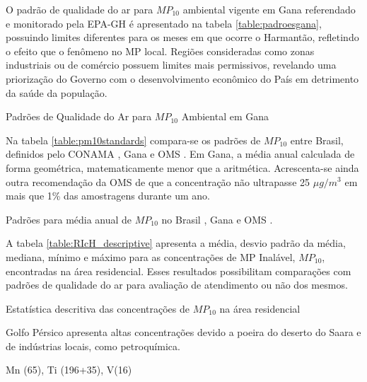 O padrão de qualidade do ar para $MP_{10}$ ambiental vigente em Gana referendado
e monitorado pela EPA-GH \citeyearpar{epa2015} é apresentado na tabela
\ref{table:padroesgana}, possuindo limites diferentes para os meses em que
ocorre o Harmantão, refletindo o efeito que o fenômeno no MP local. 
Regiões consideradas como zonas industriais ou de comércio possuem limites mais
permissivos, revelando uma priorização do Governo com o desenvolvimento 
econômico do País em detrimento da saúde da população.

\begin{table}[H]
\centering
  
\caption{Padrões de Qualidade do Ar para $MP_{10}$ Ambiental em Gana
         \cite{epa2015} \label{table:padroesgana}}
\end{table}

Na tabela \ref{table:pm10standards} compara-se os padrões de $MP_{10}$ 
entre Brasil, definidos pelo CONAMA \citeyearpar{conama1990}, Gana e OMS 
\citeyearpar{who}. Em Gana, a média anual calculada de forma geométrica, 
matematicamente menor que a aritmética. Acrescenta-se ainda outra 
recomendação da OMS de que a concentração não ultrapasse 25 $\mu g/m^3$ 
em mais que 1\% das amostragens durante um ano.

\begin{table}[H]
\centering
  
  \caption{Padrões para média anual de $MP_{10}$ no Brasil \citep{conama1990}, 
           Gana \citep{epa2015} e OMS \citep{who}. \label{table:pm10standards}}
\end{table}

A tabela \ref{table:RIcH_descriptive} apresenta a média, desvio padrão da média,
mediana, mínimo e máximo para as concentrações de MP Inalável, $MP_{10}$,  
encontradas na área residencial. Esses resultados possibilitam comparações com 
padrões de qualidade do ar para avaliação de atendimento ou não dos mesmos.    

\newpage
\begin{table}[H]
  \centering
    
  \caption{Estatística descritiva das concentrações de  $MP_{10}$ na área 
           residencial \label{table:RIcH_descriptive}}
\end{table}

\citep{kaku2016} Golfo Pérsico apresenta altas concentrações devido a poeira do 
deserto do Saara e de indústrias locais, como petroquímica. 

Mn (65), Ti (196+35), V(16)


